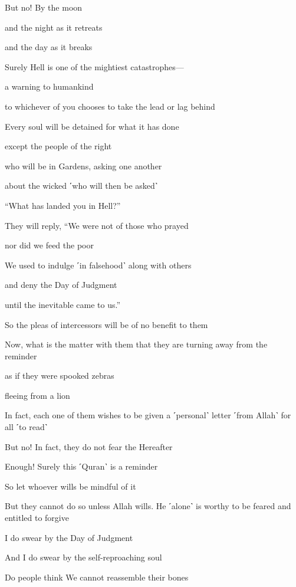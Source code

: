 But no! By the moon

and the night as it retreats

and the day as it breaks

Surely Hell is one of the mightiest catastrophes—

a warning to humankind

to whichever of you chooses to take the lead or lag behind

Every soul will be detained for what it has done

except the people of the right

who will be in Gardens, asking one another

about the wicked ˹who will then be asked˺

“What has landed you in Hell?”

They will reply, “We were not of those who prayed

nor did we feed the poor

We used to indulge ˹in falsehood˺ along with others

and deny the Day of Judgment

until the inevitable came to us.”

So the pleas of intercessors will be of no benefit to them

Now, what is the matter with them that they are turning away from the reminder

as if they were spooked zebras

fleeing from a lion

In fact, each one of them wishes to be given a ˹personal˺ letter ˹from Allah˺ for all ˹to read˺

But no! In fact, they do not fear the Hereafter

Enough! Surely this ˹Quran˺ is a reminder

So let whoever wills be mindful of it

But they cannot do so unless Allah wills. He ˹alone˺ is worthy to be feared and entitled to forgive

I do swear by the Day of Judgment

And I do swear by the self-reproaching soul

Do people think We cannot reassemble their bones

